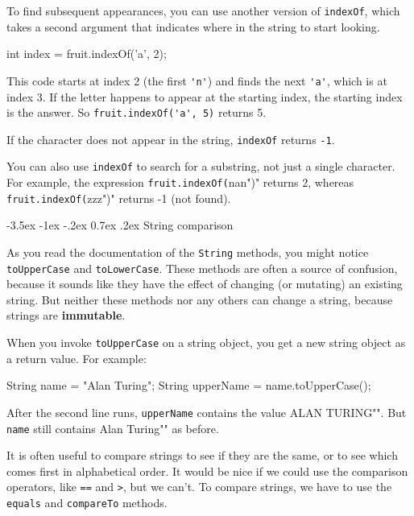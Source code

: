 \documentclass[12pt]{book}
\makeatletter
\theoremstyle{exercise}
\newcommand{\java}[1]{\verb"#1"}
\renewcommand{\section}{\@startsection{section}{1}{\z@}%
    {-3.5ex \@plus -1ex \@minus -.2ex}%
    {0.7ex \@plus.2ex}%
    {\normalfont\Large\bfseries}}
\newcommand{\java}[1]{\lstinline{#1}} %
\makeatother
\begin{document}
To find subsequent appearances, you can use another version of \java{indexOf}, which takes a second argument that indicates where in the string to start looking.

\begin{code}
    int index = fruit.indexOf('a', 2);
\end{code}

This code starts at index 2 (the first \java{'n'}) and finds the next \java{'a'}, which is at index 3.
If the letter happens to appear at the starting index, the starting index is the answer.
So \java{fruit.indexOf('a', 5)} returns 5.

If the character does not appear in the string, \java{indexOf} returns \java{-1}.

You can also use \java{indexOf} to search for a substring, not just a single character.
For example, the expression \java{fruit.indexOf("nan")} returns 2, whereas \java{fruit.indexOf("zzz")} returns -1 (not found).


\section{String comparison}
\label{immutable}


As you read the documentation of the \java{String} methods, you might notice \java{toUpperCase} and \java{toLowerCase}.
These methods are often a source of confusion, because it sounds like they have the effect of changing (or mutating) an existing string.
But neither these methods nor any others can change a string, because strings are {\bf immutable}.

When you invoke \java{toUpperCase} on a string object, you get a new string object as a return value.
For example:

\begin{code}
    String name = "Alan Turing";
    String upperName = name.toUpperCase();
\end{code}


After the second line runs, \java{upperName} contains the value \java{"ALAN TURING"}.
But \java{name} still contains \java{"Alan Turing"} as before.


It is often useful to compare strings to see if they are the same, or to see which comes first in alphabetical order.
It would be nice if we could use the comparison operators, like \java{==} and \java{>}, but we can't.
To compare strings, we have to use the \java{equals} and \java{compareTo} methods.
\end{document}
